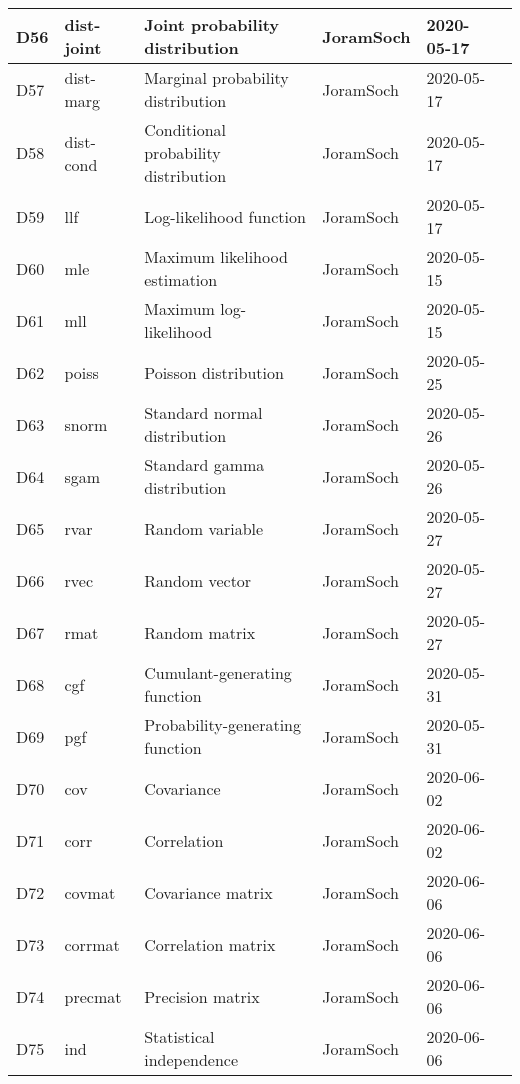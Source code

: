 \documentclass[a4paper,12pt,twoside]{book}
\begin{document}
\begin{longtable}{|p{1cm}|p{2cm}|p{6.5cm}|p{3cm}|p{2cm}|c|}
D56 & dist-joint & Joint probability distribution & JoramSoch & 2020-05-17 & \pageref{sec:dist-joint} \\ \hline
D57 & dist-marg & Marginal probability distribution & JoramSoch & 2020-05-17 & \pageref{sec:dist-marg} \\ \hline
D58 & dist-cond & Conditional probability distribution & JoramSoch & 2020-05-17 & \pageref{sec:dist-cond} \\ \hline
D59 & llf & Log-likelihood function & JoramSoch & 2020-05-17 & \pageref{sec:llf} \\ \hline
D60 & mle & Maximum likelihood estimation & JoramSoch & 2020-05-15 & \pageref{sec:mle} \\ \hline
D61 & mll & Maximum log-likelihood & JoramSoch & 2020-05-15 & \pageref{sec:mll} \\ \hline
D62 & poiss & Poisson distribution & JoramSoch & 2020-05-25 & \pageref{sec:poiss} \\ \hline
D63 & snorm & Standard normal distribution & JoramSoch & 2020-05-26 & \pageref{sec:snorm} \\ \hline
D64 & sgam & Standard gamma distribution & JoramSoch & 2020-05-26 & \pageref{sec:sgam} \\ \hline
D65 & rvar & Random variable & JoramSoch & 2020-05-27 & \pageref{sec:rvar} \\ \hline
D66 & rvec & Random vector & JoramSoch & 2020-05-27 & \pageref{sec:rvec} \\ \hline
D67 & rmat & Random matrix & JoramSoch & 2020-05-27 & \pageref{sec:rmat} \\ \hline
D68 & cgf & Cumulant-generating function & JoramSoch & 2020-05-31 & \pageref{sec:cgf} \\ \hline
D69 & pgf & Probability-generating function & JoramSoch & 2020-05-31 & \pageref{sec:pgf} \\ \hline
D70 & cov & Covariance & JoramSoch & 2020-06-02 & \pageref{sec:cov} \\ \hline
D71 & corr & Correlation & JoramSoch & 2020-06-02 & \pageref{sec:corr} \\ \hline
D72 & covmat & Covariance matrix & JoramSoch & 2020-06-06 & \pageref{sec:covmat} \\ \hline
D73 & corrmat & Correlation matrix & JoramSoch & 2020-06-06 & \pageref{sec:corrmat} \\ \hline
D74 & precmat & Precision matrix & JoramSoch & 2020-06-06 & \pageref{sec:precmat} \\ \hline
D75 & ind & Statistical independence & JoramSoch & 2020-06-06 & \pageref{sec:ind} \\ \hline

\end{longtable}
\end{document}
